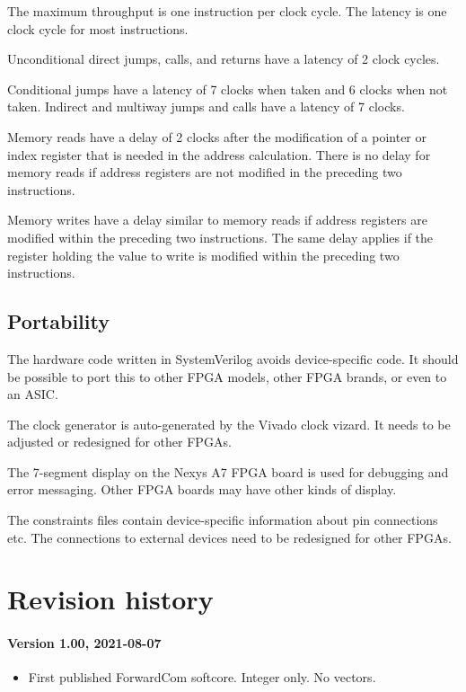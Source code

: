 \documentclass[11pt,a4paper,oneside,openright]{report}
\newcommand{\vv}{ \vspace{2mm} }   %
\begin{document}
The maximum throughput is one instruction per clock cycle. The latency is one clock cycle for most instructions. 
\vv

Unconditional direct jumps, calls, and returns have a latency of 2 clock cycles.
\vv

Conditional jumps have a latency of 7 clocks when taken and 6 clocks when not taken. Indirect and multiway jumps and calls have a latency of 7 clocks.
\vv

Memory reads have a delay of 2 clocks after the modification of a pointer or index register that is needed in the address calculation. There is no delay for memory reads if address registers are not modified in the preceding two instructions.
\vv

Memory writes have a delay similar to memory reads if address registers are modified within the preceding two instructions. The same delay applies if the register holding the value to write is modified within the preceding two instructions.
\vv


\section{Portability}
The hardware code written in SystemVerilog avoids device-specific code. It should be possible to port this to other FPGA models, other FPGA brands, or even to an ASIC.
\vv

The clock generator is auto-generated by the Vivado clock vizard. It needs to be adjusted or redesigned for other FPGAs.
\vv

The 7-segment display on the Nexys A7 FPGA board is used for debugging and error messaging. Other FPGA boards may have other kinds of display.
\vv

The constraints files contain device-specific information about pin connections etc. The connections to external devices need to be redesigned for other FPGAs.
\vv


\chapter{Revision history}

\subsubsection{Version 1.00, 2021-08-07}

\begin{itemize}
\item First published ForwardCom softcore. Integer only. No vectors.
\end{itemize}
\vv
\end{document}
